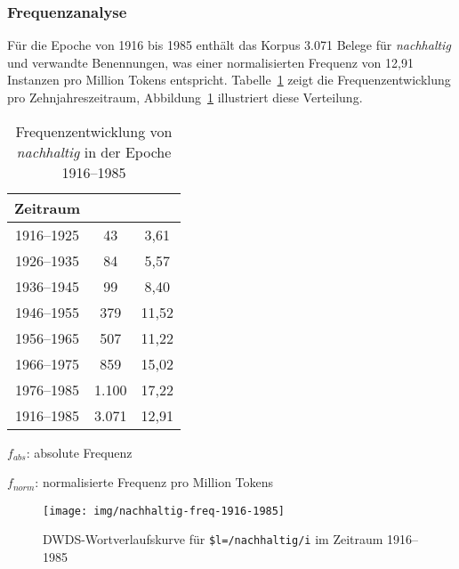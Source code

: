 \documentclass[
    german,
    a4paper,%
    12pt,%
    oneside,%
    toc=bibliography,
    final,
]{scrartcl}
\begin{document}
\subsubsection{Frequenzanalyse}

Für die Epoche von 1916 bis 1985 enthält das Korpus 3.071 Belege für \textit{nachhaltig} und verwandte Benennungen, was einer normalisierten Frequenz von 12,91 Instanzen pro Million Tokens entspricht. Tabelle~\ref{tab:freq-epoche3} zeigt die Frequenzentwicklung pro Zehnjahreszeitraum, Abbildung~\ref{fig:nachhaltig-freq-1916-1985} illustriert diese Verteilung.

\begin{table}[h!]
	\centering
	\renewcommand{\arraystretch}{1.5}
	
	\caption{Frequenzentwicklung von \textit{nachhaltig} in der Epoche 1916–1985}
	\label{tab:freq-epoche3}
	
	\begin{threeparttable}
	
	\begin{tabular}{ccc}
	\textbf{Zeitraum} & \boldmath{$f_{abs}$} & \boldmath{$f_{norm}$} \\ \hline
	1916–1925 & 43 & 3,61 \\ \hline
	1926–1935 & 84 & 5,57 \\ \hline
	1936–1945 & 99 & 8,40 \\ \hline
	1946–1955 & 379 & 11,52 \\ \hline
	1956–1965 & 507 & 11,22 \\ \hline
	1966–1975 & 859 & 15,02 \\ \hline
	1976–1985 & 1.100 & 17,22 \\ \hline\hline
	1916–1985 & 3.071 & 12,91 \\ \hline
	\end{tabular} 
	
	\begin{tablenotes}
	\footnotesize
	\setlength{\itemindent}{-1.2em}
	\item $f_{abs}$: absolute Frequenz
	\item $f_{norm}$: normalisierte Frequenz pro Million Tokens
	\end{tablenotes}
	
	\end{threeparttable}
\end{table}

\begin{figure}[h!]
	\centering
	
	\texttt{[image: img/nachhaltig-freq-1916-1985]}
	\caption[corpus-size]{DWDS-Wortverlaufskurve für \lstinline|$l=/nachhaltig/i| im Zeitraum 1916–1985\protect\footnotemark}
	\label{fig:nachhaltig-freq-1916-1985}
\end{figure}
\end{document}
